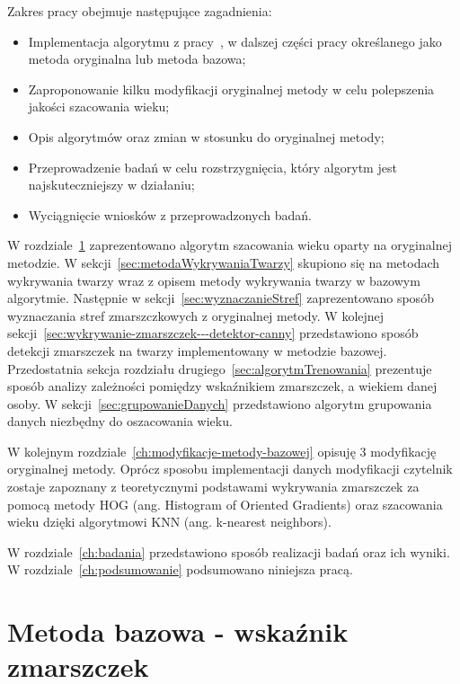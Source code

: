 \documentclass[a4paper,twoside,12pt]{book}
\begin{document}
    Zakres pracy obejmuje następujące zagadnienia:
    \begin{itemize}
        \item Implementacja algorytmu z pracy~\cite{wrinkleFeatures}, w dalszej części pracy określanego jako metoda
        oryginalna lub metoda bazowa;
        \item Zaproponowanie kilku modyfikacji oryginalnej metody w celu polepszenia jakości szacowania wieku;
        \item Opis algorytmów oraz zmian w stosunku do oryginalnej metody;
        \item Przeprowadzenie badań w celu rozstrzygnięcia, który algorytm jest najskuteczniejszy w działaniu;
        \item Wyciągnięcie wniosków z przeprowadzonych badań.
    \end{itemize}
    W rozdziale~\ref{ch:metoda-bazowa---wrinkle-feature} zaprezentowano algorytm szacowania wieku oparty na oryginalnej metodzie.
    W sekcji~\ref{sec:metodaWykrywaniaTwarzy} skupiono się na metodach wykrywania twarzy wraz z opisem
    metody wykrywania twarzy w bazowym algorytmie.
    Następnie w sekcji~\ref{sec:wyznaczanieStref} zaprezentowano sposób wyznaczania stref zmarszczkowych z oryginalnej metody.
    W kolejnej sekcji~\ref{sec:wykrywanie-zmarszczek---detektor-canny} przedstawiono sposób detekcji zmarszczek na twarzy implementowany
    w metodzie bazowej.
    Przedostatnia sekcja rozdziału drugiego~\ref{sec:algorytmTrenowania}  prezentuje sposób analizy %
    zależności pomiędzy wskaźnikiem zmarszczek, a wiekiem
    danej osoby.
    W sekcji~\ref{sec:grupowanieDanych} przedstawiono algorytm grupowania danych niezbędny do oszacowania wieku.

    W kolejnym rozdziale~\ref{ch:modyfikacje-metody-bazowej} opisuję 3 modyfikację oryginalnej metody.
    Oprócz sposobu implementacji danych modyfikacji czytelnik zostaje zapoznany z teoretycznymi podstawami wykrywania zmarszczek za
    pomocą metody HOG (ang. Histogram of Oriented Gradients) oraz szacowania wieku dzięki algorytmowi KNN (ang.
    k-nearest neighbors).

    W rozdziale~\ref{ch:badania} przedstawiono sposób realizacji badań oraz ich wyniki.
    W rozdziale~\ref{ch:podsumowanie} podsumowano niniejsza pracą.

    \chapter{Metoda bazowa - wskaźnik zmarszczek}\label{ch:metoda-bazowa---wrinkle-feature}
\end{document}
